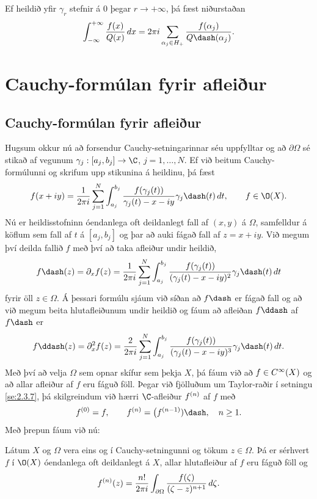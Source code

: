 \noindent
Ef heildið yfir ${\gamma}_r$ stefnir á $0$ þegar $r\to+{\infty}$,  
þá fæst niðurstaðan
 $$\int_{-\infty}\sp {+\infty} \dfrac {f(x)}{Q(x)}\, dx=
2\pi i\sum_{\alpha_j\in H_+} \dfrac{f(\alpha_j)}{Q\dash(\alpha_j)}.
 $$

\section{Cauchy-formúlan fyrir afleiður}



\subsection*{Cauchy-formúlan fyrir afleiður}

Hugsum okkur nú að forsendur Cauchy-setningarinnar séu uppfylltar og
að $\partial\Omega$ sé stikað af vegunum
$\gamma_j:[a_j,b_j]\to \C$, $j=1,\dots,N$.  Ef við beitum
Cauchy-formúlunni og skrifum upp stikunina á heildinu, þá fæst
 $$f(x+iy)=\dfrac 1{2\pi i}\sum_{j=1}\sp N \int_{a_j}\sp {b_j}
\dfrac {f(\gamma_j(t))}{\gamma_j(t)-x-iy}\gamma_j\dash(t)\, dt, 
\qquad f\in \O(X).
 $$
Nú er heildisstofninn óendanlega oft deildanlegt fall af $(x,y)$ á
$\Omega$, samfelldur á köflum sem fall af $t$ á $[a_j,b_j]$ og þar að
auki fágað fall af $z=x+iy$.  Við
megum því deilda fallið $f$ með því að taka afleiður undir heildið,
 \begin{equation*}f\dash(z)=\partial_xf(z)=
\dfrac 1{2\pi i}\sum_{j=1}\sp N \int_{a_j}\sp {b_j}
\dfrac {f(\gamma_j(t))}{(\gamma_j(t)-x-iy)\sp 2}\gamma_j\dash(t)\, dt
\label{10.3.1}
 \end{equation*}
fyrir öll $z\in \Omega$.  {Á} þessari formúlu sjáum við síðan að
$f\dash$ er fágað fall og að við megum beita hlutafleiðunum undir
heildið og fáum að afleiðan $f\ddash$ af $f\dash$ er
 \begin{equation*}f\ddash(z)=\partial_x\sp 2f(z)=
\dfrac 2{2\pi i}\sum_{j=1}\sp N \int_{a_j}\sp {b_j}
\dfrac {f(\gamma_j(t))}{(\gamma_j(t)-x-iy)\sp 3}\gamma_j\dash(t)\, dt.
\label{10.3.2}
 \end{equation*}
Með því að velja $\Omega$ sem opnar skífur sem þekja $X$, þá fáum við
að $f\in C\sp{\infty}(X)$ og að allar afleiður af $f$ eru fáguð
föll.  Þegar við fjölluðum um Taylor-raðir í setningu
\ref{se:2.3.7}, þá skilgreindum við  hærri $\C$-afleiður $f\sp{(n)}$ af $f$ með
 $$f\sp{(0)}=f, \qquad f\sp{(n)}=\big(f\sp{(n-1)})\dash, \quad n\geq 1.
 $$
Með þrepun fáum við nú:
\begin{se}\label{set10.3.1}  
Látum $X$ og $\Omega$ vera eins og í Cauchy-setningunni
og tökum $z\in \Omega$.  Þá er sérhvert $f$ í $\O(X)$
óendanlega oft deildanlegt á $X$, allar hlutafleiður af $f$ eru
fáguð föll og
 \begin{equation*}f\sp{(n)}(z)=
\dfrac {n!}{2\pi i}\int_{\partial\Omega}
\dfrac {f(\zeta)}{(\zeta-z)\sp {n+1}}\, d\zeta.
\label{10.3.3}
 \end{equation*}
\end{se}


